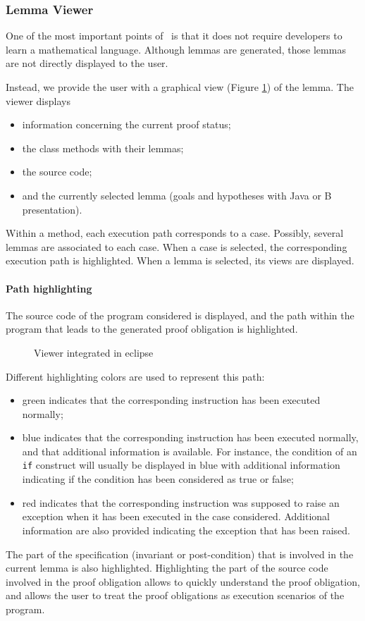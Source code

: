 \subsubsection{Lemma Viewer}
\label{Viewer}
One of the most important points of \JACK\ is that it does not require
developers to learn a mathematical language.  Although lemmas are
generated, those lemmas are not directly displayed to the user.

Instead, we provide the user with a graphical view (Figure \ref{Viewer image}) of the lemma.
 The viewer displays
 \begin{itemize}
  \item information concerning the current proof status;
  \item the class methods with their lemmas;
  \item the source code;
  \item and the currently selected lemma (goals and hypotheses with Java or B presentation).
\end{itemize}
 Within a method, each execution path corresponds to a case.
 Possibly, several lemmas are associated to each case.
 When a case is selected, the corresponding execution path is highlighted.
 When a lemma is selected, its views are displayed.
\paragraph{Path highlighting}
The source code of the program considered is displayed, and the
path within the program that leads to the generated proof obligation
is highlighted.

\begin{figure}[th]
 \caption{Viewer integrated in eclipse}
 \label{Viewer image}
\end{figure}

Different highlighting colors are used to represent this path:
\begin{itemize}
\item green indicates that the corresponding instruction has been
   executed normally;
\item blue indicates that the corresponding instruction has been
   executed normally, and that additional information is
   available. For instance, the condition of an \texttt{if} construct will
   usually be displayed in blue with additional information indicating
   if the condition has been considered as true or false;
\item red indicates that the corresponding instruction was supposed to
   raise an exception when it has been executed in the case
   considered.  Additional information are also provided indicating
   the exception that has been raised.
\end{itemize}
The part of the specification (invariant or post-condition) that is
involved in the current lemma is also highlighted.  Highlighting the
part of the source code involved in the proof obligation allows to
quickly understand the proof obligation, and allows the user to treat
the proof obligations as execution scenarios of the program.
